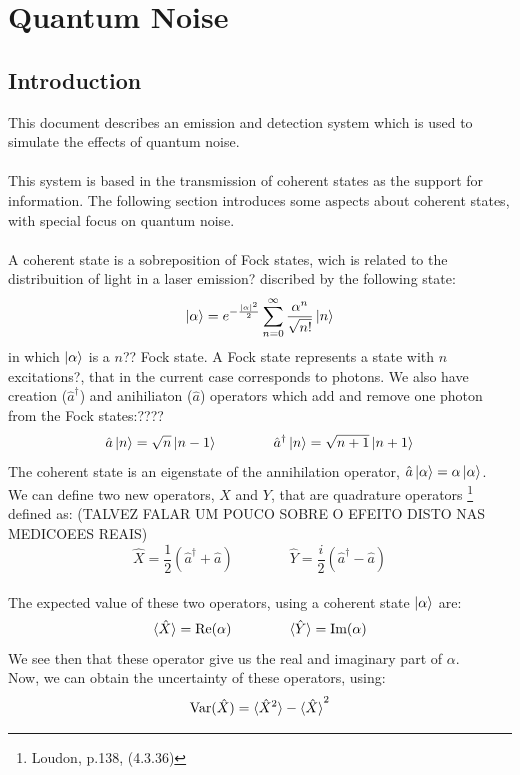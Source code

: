 \clearpage
\section{Quantum Noise}

\subsection*{Introduction}\label{sec:intro}


This document describes an emission and detection system which is used to simulate the effects of quantum noise.
\\
\\
This system is based in the transmission of coherent states as the support for information. The following section introduces some aspects about coherent states, with special focus on quantum noise.\\
\\
A coherent state is a sobreposition of Fock states, wich is related to the distribuition of light in a laser emission? discribed by the following state:\\
$$
\ket{\alpha} = e^{-\frac{|\alpha|^2}{2}} \sum_{n=0}^\infty \frac{\alpha^n}{\sqrt{n!}} \ket{n}
$$
in which $\ket{\alpha}$ is a $n$?? Fock state. A Fock state represents a state with $n$ excitations?, that in the current case corresponds to photons. We also have creation ($\hat{a}^\dagger$) and anihiliaton ($\hat{a}$) operators which add and remove one photon from the Fock states:????$$
\hat{a} \ket{n} = \sqrt{n} \ket{n-1} \qquad \qquad \hat{a}^\dagger \ket{n} = \sqrt{n+1} \ket{n+1}
$$
The coherent state is an eigenstate of the annihilation operator, $\hat{a}\ket{\alpha} = \alpha \ket{\alpha}$.\\
We can define two new operators,  $X$ and $Y$, that are quadrature operators
\footnote{Loudon, p.138, (4.3.36)}
defined as: (TALVEZ FALAR UM POUCO SOBRE O EFEITO DISTO NAS MEDICOEES REAIS)
$$
\hat{X} = \frac{1}{2} \left( \hat{a}^\dagger + \hat{a} \right) \qquad \qquad
\hat{Y} = \frac{i}{2} \left( \hat{a}^\dagger - \hat{a} \right)
$$
\\
The expected value of these two operators, using a coherent state $\ket{\alpha}$ are:
$$
\braket{\hat{X}} = \textrm{Re}(\alpha) \qquad \qquad
\braket{\hat{Y}} = \textrm{Im}(\alpha)
$$
We see then that these operator give us the real and imaginary part of $\alpha$.\\
Now, we can obtain the uncertainty of these operators, using:
$$
\textrm{Var}(\hat{X}) = \braket{\hat{X}^2} - \braket{\hat{X}}^2
$$

